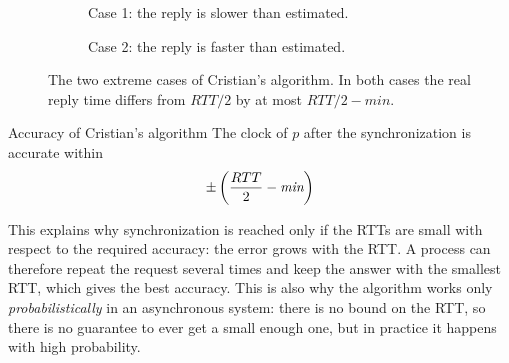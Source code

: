 \begin{figure}[H]
  \centering
  \begin{subfigure}{0.48\textwidth}
    \centering
    \caption{Case 1: the reply is slower than estimated.}
  \end{subfigure}
  \hfill
  \begin{subfigure}{0.48\textwidth}
    \centering
    \caption{Case 2: the reply is faster than estimated.}
  \end{subfigure}
  \caption{The two extreme cases of Cristian's algorithm. In both cases the real reply time differs from $RTT/2$ by at most $RTT/2 - \textit{min}$.}
  \label{fig:cristian-accuracy}
\end{figure}

\begin{framedprop}{Accuracy of Cristian's algorithm}
  The clock of $p$ after the synchronization is accurate within
  \[\pm \left( \frac{RTT}{2} - \textit{min} \right)\]
\end{framedprop}

This explains why synchronization is reached only if the RTTs are small with respect to the required accuracy: the error grows with the RTT. A process can therefore repeat the request several times and keep the answer with the smallest RTT, which gives the best accuracy. This is also why the algorithm works only \textit{probabilistically} in an asynchronous system: there is no bound on the RTT, so there is no guarantee to ever get a small enough one, but in practice it happens with high probability.

